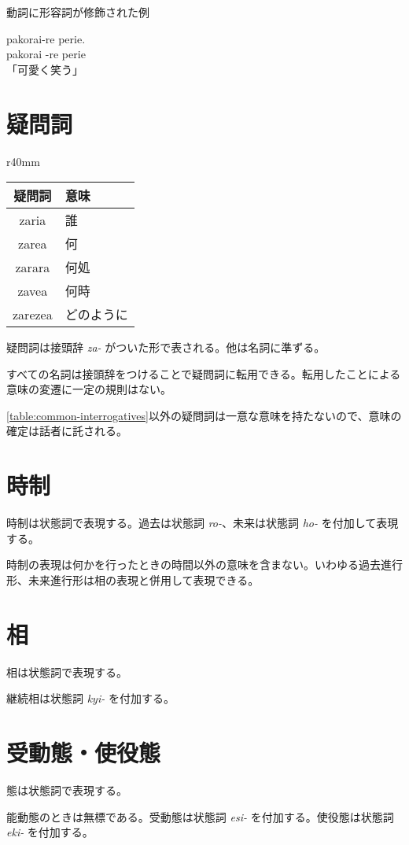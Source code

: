 \begin{itembox}[l]{動詞に形容詞が修飾された例}
    \begin{pindent}
        \noindent
        pakorai-re perie. \vspace{-1mm} \\
        pakorai -re perie \vspace{-1mm} \\
        「可愛く笑う」
    \end{pindent}
\end{itembox}

\section{疑問詞}

\begin{wraptable}[6]{r}{40mm}
    \centering
    \caption{主な疑問詞}
    \label{table:common-interrogatives}
    \begin{tabular}{cl}
        \toprule
        疑問詞 & 意味 \\
        \midrule
        zaria   & 誰 \\
        zarea   & 何 \\
        zarara  & 何処 \\
        zavea   & 何時 \\
        zarezea & どのように \\
        \bottomrule
    \end{tabular}
\end{wraptable}

疑問詞は接頭辞 \emph{za-} がついた形で表される。他は名詞に準ずる。

すべての名詞は接頭辞をつけることで疑問詞に転用できる。転用したことによる意味の変遷に一定の規則はない。

\cref{table:common-interrogatives}以外の疑問詞は一意な意味を持たないので、意味の確定は話者に託される。

\section{時制}

時制は状態詞で表現する。過去は状態詞 \emph{ro-}、未来は状態詞 \emph{ho-} を付加して表現する。

時制の表現は何かを行ったときの時間以外の意味を含まない。いわゆる過去進行形、未来進行形は相の表現と併用して表現できる。

\section{相}

相は状態詞で表現する。

継続相は状態詞 \emph{kyi-} を付加する。

\section{受動態・使役態}

態は状態詞で表現する。

能動態のときは無標である。受動態は状態詞 \emph{esi-} を付加する。使役態は状態詞 \emph{eki-} を付加する。